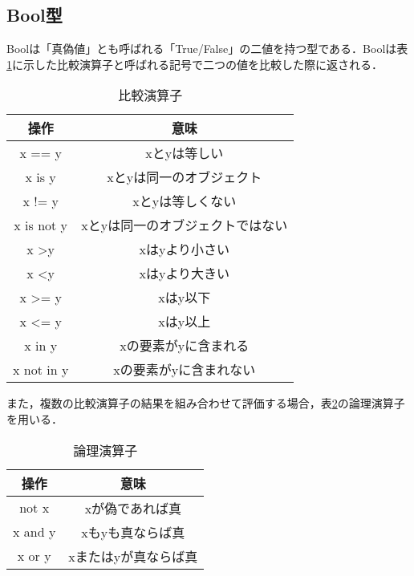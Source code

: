 \subsection{Bool型}
Boolは「真偽値」とも呼ばれる「True/False」の二値を持つ型である．Boolは表\ref{comparative_operator}に示した比較演算子と呼ばれる記号で二つの値を比較した際に返される．
\begin{table}[h]
 \centering
   \caption{比較演算子}
    \begin{tabular}{|c|c|} \hline
     操作 & 意味 \\ \hline \hline
     x == y & xとyは等しい \\ \hline
     x is y & xとyは同一のオブジェクト \\ \hline
     x != y & xとyは等しくない \\ \hline
     x is not y & xとyは同一のオブジェクトではない \\ \hline
     x \textgreater y & xはyより小さい \\ \hline
     x \textless y & xはyより大きい \\ \hline
     x \textgreater= y & xはy以下 \\ \hline
     x \textless= y & xはy以上 \\ \hline
     x in y & xの要素がyに含まれる \\ \hline
     x not in y & xの要素がyに含まれない \\ \hline
    \end{tabular}
   \label{comparative_operator}
\end{table}

また，複数の比較演算子の結果を組み合わせて評価する場合，表\ref{logical_operator}の論理演算子を用いる．
\begin{table}[h]
 \centering
  \caption{論理演算子}
   \begin{tabular}{|c|c|} \hline
   操作 & 意味 \\ \hline \hline
   not x & xが偽であれば真 \\ \hline
   x and y & xもyも真ならば真 \\ \hline
   x or y & xまたはyが真ならば真 \\ \hline
   \end{tabular}
  \label{logical_operator}
\end{table}


